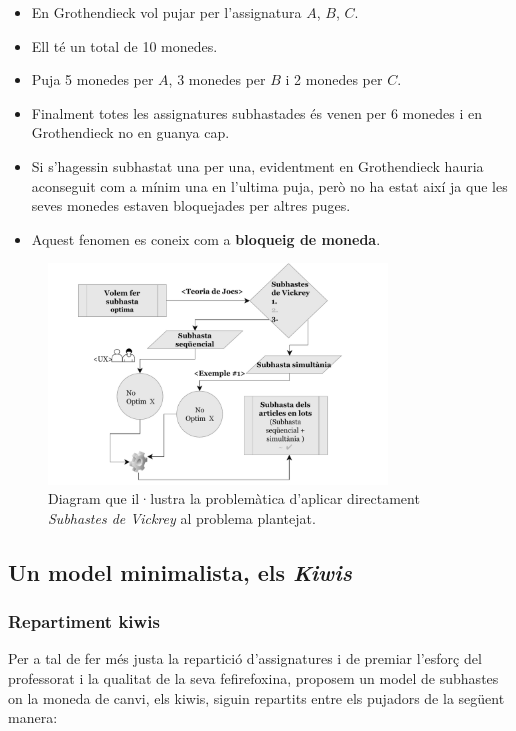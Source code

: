 \documentclass[10pt,twocolumn]{article}
\begin{document}
\begin{tcolorbox}[colback=black!1,title=\textbf{Exemple \# 1},coltitle=black,colbacktitle=black!10]
\begin{itemize}
	\item En Grothendieck vol pujar per l'assignatura $A$, $B$, $C$.
	\item Ell té un total de 10 monedes.
	\item Puja 5 monedes per $A$, 3 monedes per $B$ i 2 monedes per $C$.
	\item Finalment totes les assignatures subhastades és venen per 6 monedes i en Grothendieck no en guanya cap.
	\item Si s'hagessin subhastat una per una, evidentment en Grothendieck hauria aconseguit com a mínim una en l'ultima puja, però no ha estat així  ja que les seves monedes estaven bloquejades per altres puges. \item Aquest fenomen es coneix com a \textbf{bloqueig de moneda}.
\end{itemize}
\end{tcolorbox}
\begin{figure}[!]
	\centering
	\includegraphics[width=9cm]{subs}
	\caption{ \footnotesize Diagram que il·lustra la problemàtica d'aplicar directament \textit{Subhastes de Vickrey} al problema plantejat.}
	\label{fig:4}
\end{figure}
\subsection{Un model minimalista, els \textit{Kiwis}}
\subsubsection{Repartiment kiwis}
Per a tal de fer més justa la repartició d'assignatures i de premiar l'esforç del professorat i la qualitat de la seva fefirefoxina, proposem un model de subhastes on la moneda de canvi, els kiwis, siguin repartits entre els pujadors de la següent manera:
\end{document}
